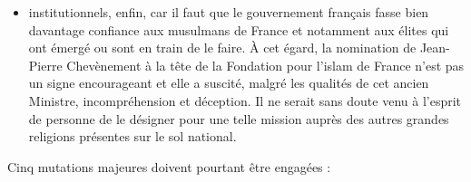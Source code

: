 \begin{itemize}
\item
  institutionnels, enfin, car il faut que le gouvernement français fasse
  bien davantage confiance aux musulmans de France et notamment aux
  élites qui ont émergé ou sont en train de le faire. À cet égard, la
  nomination de Jean-Pierre Chevènement à la tête de la Fondation pour
  l'islam de France n'est pas un signe encourageant et elle a suscité,
  malgré les qualités de cet ancien Ministre, incompréhension et
  déception. Il ne serait sans doute venu à l'esprit de personne de le
  désigner pour une telle mission auprès des autres grandes religions
  présentes sur le sol national.
\end{itemize}


Cinq mutations majeures doivent pourtant être engagées :


